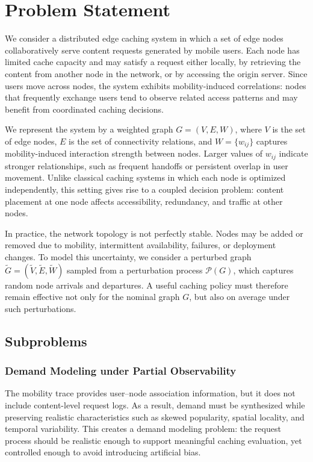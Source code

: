 \section{Problem Statement}

We consider a distributed edge caching system in which a set of edge nodes collaboratively serve content requests generated by mobile users. Each node has limited cache capacity and may satisfy a request either locally, by retrieving the content from another node in the network, or by accessing the origin server. Since users move across nodes, the system exhibits mobility-induced correlations: nodes that frequently exchange users tend to observe related access patterns and may benefit from coordinated caching decisions.

We represent the system by a weighted graph \(G=(V,E,W)\), where \(V\) is the set of edge nodes, \(E\) is the set of connectivity relations, and \(W=\{w_{ij}\}\) captures mobility-induced interaction strength between nodes. Larger values of \(w_{ij}\) indicate stronger relationships, such as frequent handoffs or persistent overlap in user movement. Unlike classical caching systems in which each node is optimized independently, this setting gives rise to a coupled decision problem: content placement at one node affects accessibility, redundancy, and traffic at other nodes.

In practice, the network topology is not perfectly stable. Nodes may be added or removed due to mobility, intermittent availability, failures, or deployment changes. To model this uncertainty, we consider a perturbed graph \(\tilde{G}=(\tilde{V},\tilde{E},\tilde{W})\) sampled from a perturbation process \(\mathcal{P}(G)\), which captures random node arrivals and departures. A useful caching policy must therefore remain effective not only for the nominal graph \(G\), but also on average under such perturbations.

\subsection{Subproblems}

\subsubsection{Demand Modeling under Partial Observability}
The mobility trace provides user--node association information, but it does not include content-level request logs. As a result, demand must be synthesized while preserving realistic characteristics such as skewed popularity, spatial locality, and temporal variability. This creates a demand modeling problem: the request process should be realistic enough to support meaningful caching evaluation, yet controlled enough to avoid introducing artificial bias.


